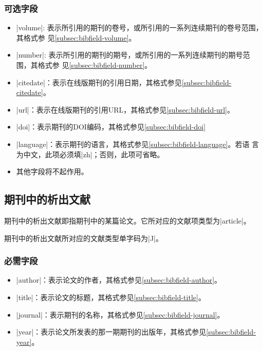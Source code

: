 \subsubsection{可选字段}

\begin{itemize}
\item |volume|: 表示所引用的期刊的卷号，或所引用的一系列连续期刊的卷号范围，其格式参
  见\ref{subsec:bibfield-volume}。
\item |number|: 表示所引用的期刊的期号，或所引用的一系列连续期刊的期号范围，其格式参
  见\ref{subsec:bibfield-number}。
\item |citedate|：表示在线版期刊的引用日期，其格式参见\ref{subsec:bibfield-citedate}。
\item |url|：表示在线版期刊的引用URL，其格式参见\ref{subsec:bibfield-url}。
\item |doi|：表示期刊的DOI编码，其格式参见\ref{subsec:bibfield-doi}
\item |language|：表示期刊的语言，其格式参见\ref{subsec:bibfield-language}。若语
  言为中文，此项必须填|zh|；否则，此项可省略。
\item 其他字段将不起作用。
\end{itemize}

\subsection{期刊中的析出文献}\label{subsec:bibtype-article}

期刊中的析出文献即指期刊中的某篇论文。它所对应的{\BibTeX}文献项类型为|article|。

期刊中的析出文献所对应的文献类型\cite{gbt3469-1983}单字码为|J|。

\subsubsection{必需字段}

\begin{itemize}
\item |author|：表示论文的作者，其格式参见\ref{subsec:bibfield-author}。
\item |title|：表示论文的标题，其格式参见\ref{subsec:bibfield-title}。
\item |journal|：表示期刊的名称，其格式参见\ref{subsec:bibfield-journal}。
\item |year|：表示论文所发表的那一期期刊的出版年，其格式参见\ref{subsec:bibfield-year}。
\end{itemize}

